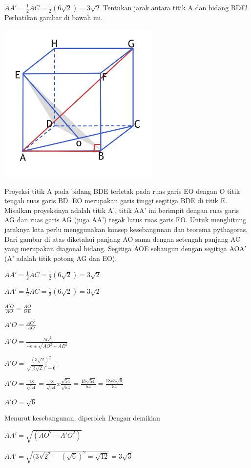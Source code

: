 \documentclass[11pt,fleqn]{book} %
\begin{document}
	${AA}' = \frac{1}{2} AC=\frac{1}{2}(6\sqrt{2})=3\sqrt{2}$
	Tentukan jarak antara titik A dan bidang BDE!  Perhatikan gambar di bawah ini.

\includegraphics[width = 8cm, height= 8cm]{Pictures/dede6.jpg}


	Proyeksi titik A pada bidang BDE terletak pada ruas garis EO dengan O titik tengah ruas garis BD. EO merupakan garis tinggi segitiga BDE di titik E. Misalkan proyeksinya adalah titik A', titik AA' ini berimpit dengan ruas garis AG dan ruas garis AG (juga AA') tegak lurus ruas garis EO. Untuk menghitung jaraknya kita perlu menggunakan konsep kesebangunan dan teorema pythagoras.
	Dari gambar di atas diketahui panjang AO sama dengan setengah panjang AC yang merupakan diagonal bidang. Segitiga AOE sebangun dengan segitiga AOA' (A' adalah titik potong AG dan EO).

	${AA}' = \frac{1}{2} AC=\frac{1}{2}(6\sqrt{2})=3\sqrt{2}$

${AA}' = \frac{1}{2} AC=\frac{1}{2}(6\sqrt{2})=3\sqrt{2}$

$\frac{{A}'O}{AO} = \frac{AO}{OE}$

${A}'O = \frac{AO^{2}}{AO}$

${A}'O = \frac{AO^{2}}{-b\pm \sqrt{AO^{2} + AE^{2}} }$

${A}'O = \frac{(3\sqrt{2})^{2}}{\sqrt{(3\sqrt{2}})^{2}+6}$

${A}'O = \frac{18}{\sqrt{54}}= \frac{18}{\sqrt{54}} x \frac{\sqrt{54}}{\sqrt{54}} = \frac{18\sqrt{54}}{54} = \frac{18x3\sqrt{6}}{54}$

${A}'O = \sqrt{6}$

	Menurut kesebangunan, diperoleh  Dengan demikian
	 
	${AA}' = \sqrt{(AO^{2}-{A}'O^{2})}$

	${AA}' = \sqrt{(3\sqrt{2^{2}}-(\sqrt{6})^{2}=\sqrt{12}} = 3\sqrt{3}$
\end{document}
